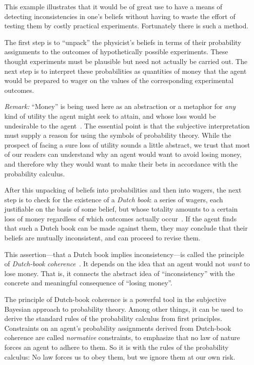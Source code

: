 \documentclass[%
 reprint,superscriptaddress,
 amsmath,amssymb,
 aps,twocolumn,pra
]{revtex4-1}
\newcommand{\tit}[1]{\textit{#1}}
\begin{document}
This example illustrates that it would be of great use to have a means of detecting inconsistencies in one's beliefs without having to waste the effort of testing them by costly practical experiments. Fortunately there is such a method.

The first step is to ``unpack'' the physicist's beliefs in terms of their probability assignments to the outcomes of hypothetically possible experiments. These thought experiments must be plausible but need not actually be carried out. The next step is to interpret these probabilities as quantities of money that the agent would be prepared to wager on the values of the corresponding experimental outcomes.

\tit{Remark:} ``Money'' is being used here as an abstraction or a metaphor for \tit{any} kind of utility the agent might seek to attain, and whose loss would be undesirable to the agent~\cite{BernardoSmith1994}. The essential point is that the subjective interpretation must supply a reason for using the symbols of probability theory. While the prospect of facing a sure loss of utility sounds a little abstract, we trust that most of our readers can understand why an agent would want to avoid losing money, and therefore why they would want to make their bets in accordance with the probability calculus.

After this unpacking of beliefs into probabilities and then into wagers, the next step is to check for the existence of a \tit{Dutch book}: a series of wagers, each justifiable on the basis of some belief, but whose totality amounts to a certain loss of money regardless of which outcomes actually occur~\cite{deFinetti1990, MISAK}. If the agent finds that such a Dutch book can be made against them, they may conclude that their beliefs are mutually inconsistent, and can proceed to revise them.

This assertion---that a Dutch book implies inconsis\-tency---is called the principle of \tit{Dutch-book coherence}~\cite{deFinetti1990}. It depends on the idea that an agent would not \tit{want} to lose money. That is, it connects the abstract idea of ``inconsistency'' with the concrete and meaningful consequence of ``losing money''.

The principle of Dutch-book coherence is a powerful tool in the subjective Bayesian approach to probability theory. Among other things, it can be used to derive the standard rules of the probability calculus from first principles. Constraints on an agent's probability assignments derived from Dutch-book coherence are called \tit{normative} constraints, to emphasize that no law of nature forces an agent to adhere to them. So it is with the rules of the probability calculus: No law forces us to obey them, but we ignore them at our own risk.
\end{document}
